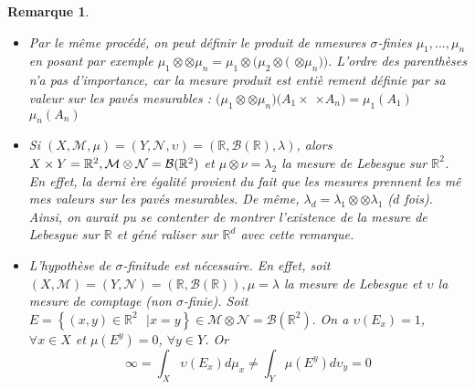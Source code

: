 \documentclass[3pt]{article}
\newtheorem{remark}[theorem]{Remarque}
\begin{document}
\bigskip

\begin{remark}
\begin{itemize}
\item Par le m\^{e}me proc\'{e}d\'{e}, on peut d\'{e}finir le produit de
nmesures $\sigma $-finies $\mu _{1},...,\mu _{n}$ en posant par exemple $\mu
_{1}\otimes $\textperiodcentered \textperiodcentered \textperiodcentered $%
\otimes \mu _{n}=\mu _{1}\otimes (\mu _{2}\otimes ($\textperiodcentered
\textperiodcentered \textperiodcentered $\otimes \mu _{n})).$ L'ordre des
parenth\`{e}ses n'a pas d'importance, car la mesure produit est enti\`{e}%
rement d\'{e}finie par sa valeur sur les pav\'{e}s mesurables : $(\mu
_{1}\otimes $\textperiodcentered \textperiodcentered \textperiodcentered $%
\otimes \mu _{n})(A_{1}\times $\textperiodcentered \textperiodcentered
\textperiodcentered $\times A_{n})=\mu _{1}(A_{1})$\textperiodcentered
\textperiodcentered \textperiodcentered $\mu _{n}(A_{n})$

\item Si $(X,\mathcal{M},\mu )=(Y,\mathcal{N},\upsilon )=(\mathbb{R},%
\mathcal{B}(\mathbb{R}),\lambda )$, alors $X\times Y=\mathbb{R}^{2},\mathcal{%
M}\otimes \mathcal{N}=\mathcal{B}(\mathbb{R}^{2})$ et $\mu \otimes \nu
=\lambda _{2}$ la mesure de Lebesgue sur $\mathbb{R}^{2}$. En effet, la derni%
\`{e}re \'{e}galit\'{e} provient du fait que les mesures prennent les m\^{e}%
mes valeurs sur les pav\'{e}s mesurables. De m\^{e}me, $\lambda _{d}=\lambda
_{1}\otimes $\textperiodcentered \textperiodcentered \textperiodcentered $%
\otimes \lambda _{1}$ ($d$ fois). Ainsi, on aurait pu se contenter de
montrer l'existence de la mesure de Lebesgue sur $\mathbb{R}$ et g\'{e}n\'{e}%
raliser sur $\mathbb{R}^{d}$ avec cette remarque.

\item L'hypoth\`{e}se de $\sigma $-finitude est n\'{e}cessaire. En effet,
soit $(X,\mathcal{M})=(Y,\mathcal{N})=(\mathbb{R},\mathcal{B}(\mathbb{R}%
)),\mu =\lambda $ la mesure de Lebesgue et $\upsilon $ la mesure de comptage
(non $\sigma $-finie). Soit $E=\left\{ (x,y)\in \mathbb{R}^{2}\text{ }|\text{
}x=y\right\} \in \mathcal{M}\otimes \mathcal{N}=\mathcal{B}(\mathbb{R}^{2}).$
On a $\upsilon (E_{x})=1$, $\forall x\in X$ et $\mu (E^{y})=0$, $\forall
y\in Y$. Or%
\begin{equation*}
\infty =\int_{X}\upsilon (E_{x})d\mu _{x}\neq \int_{Y}\mu (E^{y})d\upsilon
_{y}=0
\end{equation*}
\end{itemize}
\end{remark}
\end{document}
